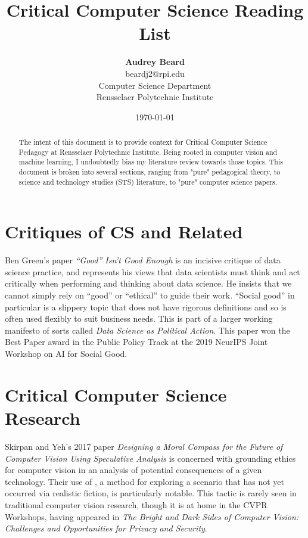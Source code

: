 \documentclass{article}
\title{Critical Computer Science Reading List}
\author{\textbf{Audrey Beard} \\
        beardj2@rpi.edu \\
        Computer Science Department \\
        Rensselaer Polytechnic Institute}
\date{\today}
\begin{document}
\maketitle

\begin{abstract}
    The intent of this document is to provide context for Critical Computer Science Pedagogy at Rensselaer Polytechnic Institute.
    Being rooted in computer vision and machine learning, I undoubtedly bias my literature review towards those topics.
    This document is broken into several sections, ranging from "pure" pedagogical theory, to science and technology studies (STS) literature, to "pure" computer science papers.
\end{abstract}
    
\section{Critiques of CS and Related}
    Ben Green's paper \textit{``Good'' Isn't Good Enough}\cite{greenGoodIsnGood2019} is an incisive critique of data science practice, and represents his views that data scientists must think and act critically when performing and thinking about data science.
    He insists that we cannot simply rely on ``good'' or ``ethical'' to guide their work. ``Social good'' in particular is a slippery topic that does not have rigorous definitions and so is often used flexibly to suit business needs.
    This is part of a larger working manifesto of sorts called \textit{Data Science as Political Action}\cite{greenDataSciencePolitical2019}.
    This paper won the Best Paper award in the Public Policy Track at the 2019 NeurIPS Joint Workshop on AI for Social Good.

\section{Critical Computer Science Research}
    Skirpan and Yeh's 2017 paper \textit{Designing a Moral Compass for the Future of Computer Vision Using Speculative Analysis }\cite{skirpanDesigningMoralCompass2017} is concerned with grounding ethics for computer vision in an analysis of potential consequences of a given technology. Their use of , a method for exploring a scenario that has not yet occurred via realistic fiction, is particularly notable.
    This tactic is rarely seen in traditional computer vision research, though it is at home in the CVPR Workshops, having appeared in \textit{The Bright and Dark Sides of Computer Vision: Challenges and Opportunities for Privacy and Security}.
    
\end{document}
